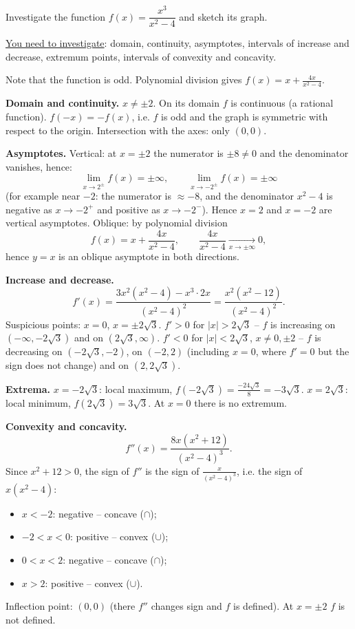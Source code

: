 
\begin{question}
Investigate the function $f(x)=\dfrac{x^3}{x^2-4}$ and sketch its graph.

\underline{You need to investigate}: domain, continuity, asymptotes, intervals of increase and decrease, extremum points, intervals of convexity and concavity.
\end{question}

\begin{hint}
Note that the function is odd. Polynomial division gives $f(x)=x+\frac{4x}{x^2-4}$.
\end{hint}

\begin{solution}
\textbf{Domain and continuity.} $x\ne\pm2$. On its domain $f$ is continuous (a rational function). $f(-x)=-f(x)$, i.e. $f$ is odd and the graph is symmetric with respect to the origin. Intersection with the axes: only $(0,0)$.

\textbf{Asymptotes.} Vertical: at $x=\pm2$ the numerator is $\pm8\ne0$ and the denominator vanishes, hence:
\[ \lim_{x\to2^\pm}f(x)=\pm\infty,\qquad \lim_{x\to-2^\pm}f(x)=\pm\infty \]
(for example near $-2$: the numerator is $\approx-8$, and the denominator $x^2-4$ is negative as $x\to-2^+$ and positive as $x\to-2^-$). Hence $x=2$ and $x=-2$ are vertical asymptotes. Oblique: by polynomial division
\[ f(x)=x+\frac{4x}{x^2-4},\qquad \frac{4x}{x^2-4}\xrightarrow[x\to\pm\infty]{}0, \]
hence $y=x$ is an oblique asymptote in both directions.

\textbf{Increase and decrease.}
\[ f'(x)=\frac{3x^2(x^2-4)-x^3\cdot2x}{(x^2-4)^2}=\frac{x^2(x^2-12)}{(x^2-4)^2}. \]
Suspicious points: $x=0$, $x=\pm2\sqrt3$. $f'>0$ for $|x|>2\sqrt3$ -- $f$ is increasing on $(-\infty,-2\sqrt3)$ and on $(2\sqrt3,\infty)$. $f'<0$ for $|x|<2\sqrt3$, $x\ne0,\pm2$ -- $f$ is decreasing on $(-2\sqrt3,-2)$, on $(-2,2)$ (including $x=0$, where $f'=0$ but the sign does not change) and on $(2,2\sqrt3)$.

\textbf{Extrema.} $x=-2\sqrt3$: local maximum, $f(-2\sqrt3)=\frac{-24\sqrt3}{8}=-3\sqrt3$. $x=2\sqrt3$: local minimum, $f(2\sqrt3)=3\sqrt3$. At $x=0$ there is no extremum.

\textbf{Convexity and concavity.}
\[ f''(x)=\frac{8x(x^2+12)}{(x^2-4)^3}. \]
Since $x^2+12>0$, the sign of $f''$ is the sign of $\frac{x}{(x^2-4)^3}$, i.e. the sign of $x(x^2-4)$:
\begin{itemize}
  \item $x<-2$: negative -- concave ($\cap$);
  \item $-2<x<0$: positive -- convex ($\cup$);
  \item $0<x<2$: negative -- concave ($\cap$);
  \item $x>2$: positive -- convex ($\cup$).
\end{itemize}
Inflection point: $(0,0)$ (there $f''$ changes sign and $f$ is defined). At $x=\pm2$ $f$ is not defined.


\end{solution}
